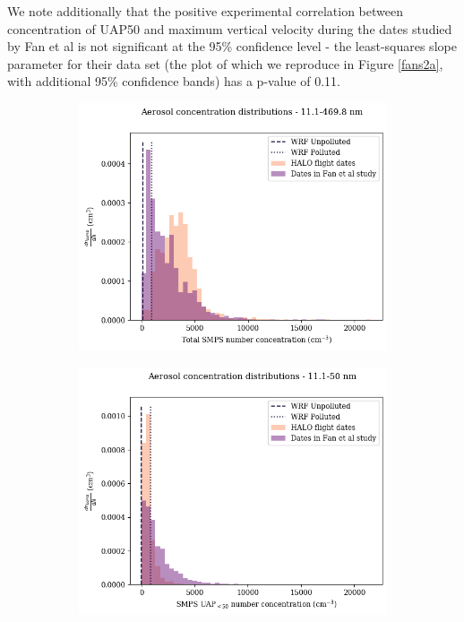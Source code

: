 \documentclass{article}
\begin{document}
We note additionally that the positive experimental correlation between concentration of UAP50 and maximum vertical velocity during the dates studied by Fan et al is not significant at the 95\% confidence level - the least-squares slope parameter for their data set (the plot of which we reproduce in Figure \ref{fans2a}, with additional 95\% confidence bands) has a p-value of 0.11.
\begin{figure}[ht]
	\centering
	\begin{subfigure}{0.7\textwidth}
		\includegraphics[width=\textwidth]{goamazon/tot_nconc_hist_alldates_figure.png}
		\label{goamazontothist}
		\caption{}
	\end{subfigure}
	\begin{subfigure}{0.7\textwidth}
		\includegraphics[width=\textwidth]{goamazon/uap50_nconc_hist_alldates_figure.png}

\end{subfigure}
\end{figure}
\end{document}
